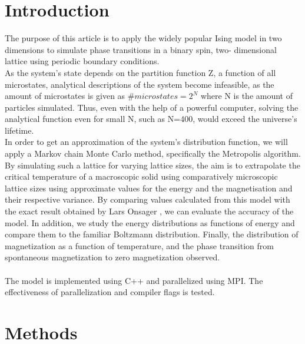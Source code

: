 \documentclass[10pt,a4paper]{article}
\begin{document}
\section{Introduction}
The purpose of this article is to apply the widely popular Ising model in two dimensions to simulate phase transitions in a binary spin, two- dimensional lattice using periodic boundary conditions. \\As the system's state depends on the partition function Z, a function of all microstates, analytical descriptions of the system become infeasible, as the amount of microstates is given as $\#microstates=2^N$ where N is the amount of particles simulated. Thus, even with the help of a powerful computer, solving the analytical function even for small N, such as N=400, would exceed the universe's lifetime.\\ In order to get an approximation of the system's distribution function, we will apply a Markov chain Monte Carlo method, specifically the Metropolis algorithm.
By simulating such a lattice for varying lattice sizes, the aim is to extrapolate the critical temperature of a macroscopic solid using comparatively microscopic lattice sizes using approximate values for the energy and the magnetisation and their respective variance. By comparing values calculated from this model with the exact result obtained by Lars Onsager \cite{onsager1944two}, we can evaluate the accuracy of the model. In addition, we study the energy distributions as functions of energy and compare them to the familiar Boltzmann distribution. Finally, the distribution of magnetization as a function of temperature, and the phase transition from spontaneous magnetization to zero magnetization observed.\\\\The model is implemented using C++ and parallelized using MPI. The effectiveness of parallelization and compiler flags is tested.
\section{Methods}
\end{document}
